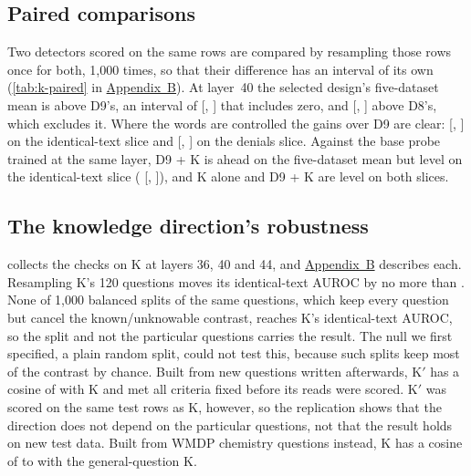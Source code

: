 \subsection{Paired comparisons}
\label{sec:stats-paired}

Two detectors scored on the same rows are compared by resampling those rows once for both, 1,000
times, so that their difference has an interval of its own (\cref{tab:k-paired} in
\hyperref[app:supplementary]{Appendix~B}). At layer~40 the selected design's five-dataset mean is
 above D9's, an interval of [,
] that includes zero, and 
[, ] above D8's, which
excludes it. Where the words are controlled the gains over D9 are clear:
 [,
] on the identical-text slice and 
[, ] on the denials slice. Against
the base probe trained at the same layer, D9 + K is  ahead on the
five-dataset mean but level on the identical-text slice (
[, ]), and K alone and D9 + K
are level on both slices.

\subsection{The knowledge direction's robustness}
\label{sec:k-robustness}

 collects the checks on K at layers 36, 40 and 44, and
\hyperref[app:supplementary]{Appendix~B} describes each. Resampling K's 120 questions moves its
identical-text AUROC by no more than . None of 1,000 balanced splits of the
same questions, which keep every question but cancel the known/unknowable contrast, reaches K's
identical-text AUROC, so the split and not the particular questions carries the result. The null we
first specified, a plain random split, could not test this, because such splits keep most of the
contrast by chance. Built from new questions written afterwards, K$'$ has a cosine of
 with K and met all  criteria fixed before its reads were
scored. K$'$ was scored on the same test rows as K, however, so the replication shows that the
direction does not depend on the particular questions, not that the result holds on new test data.
Built from WMDP chemistry questions instead, K has a cosine of  to
 with the general-question K.

